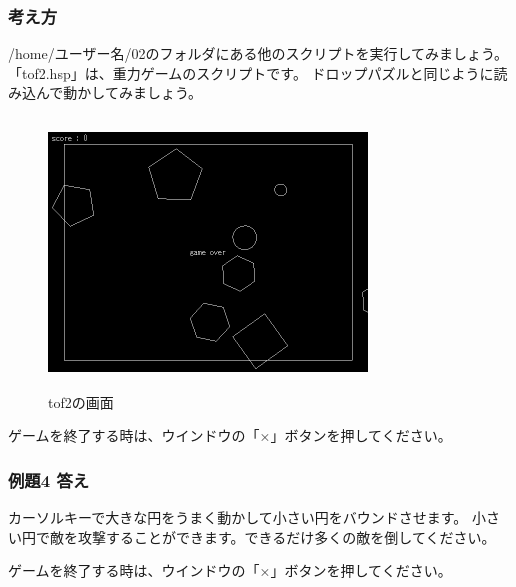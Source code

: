 \subsubsection*{考え方}

/home/ユーザー名/02のフォルダにある他のスクリプトを実行してみましょう。
「tof2.hsp」は、重力ゲームのスクリプトです。
ドロップパズルと同じように読み込んで動かしてみましょう。

\begin{figure}[H]
  \begin{center}
    \includegraphics[keepaspectratio,width=8.467cm,height=7.17cm]{images/chap02/s_tof2.png}
    \caption{tof2の画面}
  \end{center}
  \label{fig:tof2}
\end{figure}

ゲームを終了する時は、ウインドウの「×」ボタンを押してください。

\subsubsection*{例題4 答え}

カーソルキーで大きな円をうまく動かして小さい円をバウンドさせます。
小さい円で敵を攻撃することができます。できるだけ多くの敵を倒してください。

ゲームを終了する時は、ウインドウの「×」ボタンを押してください。












